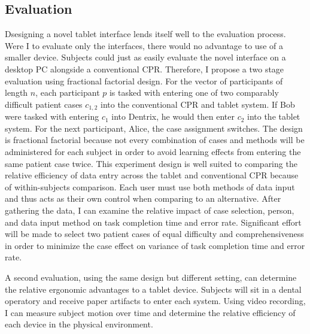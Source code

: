 \documentclass[11pt]{article}
\begin{document}
\subsection{Evaluation}
\label{eval}


Dsesigning a novel tablet interface lends itself well to the evaluation process. Were I to evaluate only the interfaces, there would no advantage to use of a smaller device. Subjects could just as easily evaluate the novel interface on a desktop PC alongside a conventional CPR. Therefore, I propose a two stage evaluation using fractional factorial design. For the vector of participants of length $n$, each participant $p$ is tasked with entering one of two comparably difficult patient cases $c_{1,2}$ into the conventional CPR and tablet system. If Bob were tasked with entering $c_1$ into Dentrix, he would then enter $c_2$ into the tablet system. For the next participant, Alice, the case assignment switches. The design is fractional factorial because not every combination of cases and methods will be administered for each subject in order to avoid learning effects from entering the same patient case twice. This experiment design is well suited to comparing the relative efficiency of data entry across the tablet and conventional CPR because of within-subjects comparison. Each user must use both methods of data input and thus acts as their own control when comparing to an alternative. After gathering the data, I can examine the relative impact of case selection, person, and data input method on task completion time and error rate. Significant effort will be made to select two patient cases of equal difficulty and comprehensiveness in order to minimize the case effect on variance of task completion time and error rate.

A second evaluation, using the same design but different setting, can determine the relative ergonomic advantages to a tablet device. Subjects will sit in a dental operatory and receive paper artifacts to enter each system. Using video recording, I can measure subject motion over time and determine the relative efficiency of each device in the physical environment.
\end{document}
